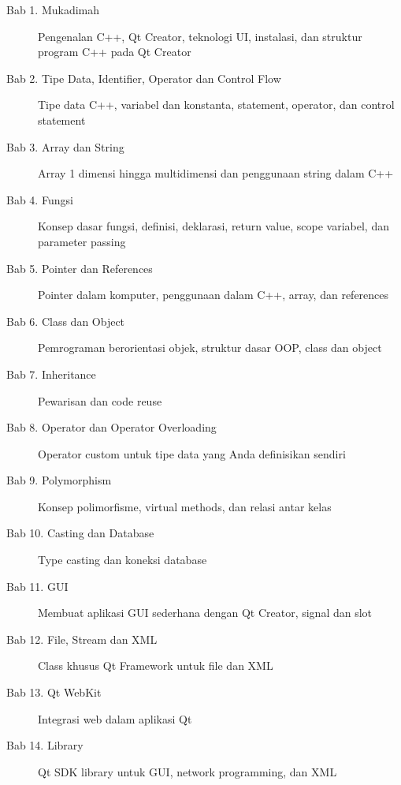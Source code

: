 \begin{description}
\item[Bab 1. Mukadimah] Pengenalan C++, Qt Creator, teknologi UI, instalasi, dan struktur program C++ pada Qt Creator
\item[Bab 2. Tipe Data, Identifier, Operator dan Control Flow] Tipe data C++, variabel dan konstanta, statement, operator, dan control statement
\item[Bab 3. Array dan String] Array 1 dimensi hingga multidimensi dan penggunaan string dalam C++
\item[Bab 4. Fungsi] Konsep dasar fungsi, definisi, deklarasi, return value, scope variabel, dan parameter passing
\item[Bab 5. Pointer dan References] Pointer dalam komputer, penggunaan dalam C++, array, dan references
\item[Bab 6. Class dan Object] Pemrograman berorientasi objek, struktur dasar OOP, class dan object
\item[Bab 7. Inheritance] Pewarisan dan code reuse
\item[Bab 8. Operator dan Operator Overloading] Operator custom untuk tipe data yang Anda definisikan sendiri
\item[Bab 9. Polymorphism] Konsep polimorfisme, virtual methods, dan relasi antar kelas
\item[Bab 10. Casting dan Database] Type casting dan koneksi database
\item[Bab 11. GUI] Membuat aplikasi GUI sederhana dengan Qt Creator, signal dan slot
\item[Bab 12. File, Stream dan XML] Class khusus Qt Framework untuk file dan XML
\item[Bab 13. Qt WebKit] Integrasi web dalam aplikasi Qt
\item[Bab 14. Library] Qt SDK library untuk GUI, network programming, dan XML
\end{description}


